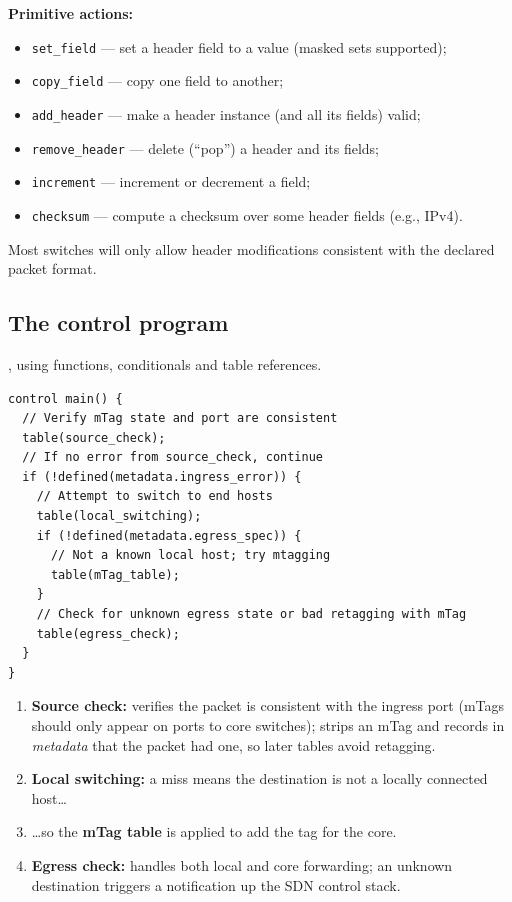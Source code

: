 \textbf{Primitive actions:}
\begin{itemize}
\item \texttt{set\_field} --- set a header field to a value (masked sets supported);
\item \texttt{copy\_field} --- copy one field to another;
\item \texttt{add\_header} --- make a header instance (and all its fields) valid;
\item \texttt{remove\_header} --- delete (``pop'') a header and its fields;
\item \texttt{increment} --- increment or decrement a field;
\item \texttt{checksum} --- compute a checksum over some header fields (e.g., IPv4).
\end{itemize}
Most switches will only allow header modifications consistent with the declared packet format.

\subsection{The control program}
, using functions, conditionals and table references.
\begin{lstlisting}
control main() {
  // Verify mTag state and port are consistent
  table(source_check);
  // If no error from source_check, continue
  if (!defined(metadata.ingress_error)) {
    // Attempt to switch to end hosts
    table(local_switching);
    if (!defined(metadata.egress_spec)) {
      // Not a known local host; try mtagging
      table(mTag_table);
    }
    // Check for unknown egress state or bad retagging with mTag
    table(egress_check);
  }
}
\end{lstlisting}
\begin{enumerate}
\item \textbf{Source check:} verifies the packet is consistent with the ingress port (mTags should only appear on ports to core switches); strips an mTag and records in \emph{metadata} that the packet had one, so later tables avoid retagging.
\item \textbf{Local switching:} a miss means the destination is not a locally connected host\ldots
\item \ldots so the \textbf{mTag table} is applied to add the tag for the core.
\item \textbf{Egress check:} handles both local and core forwarding; an unknown destination triggers a notification up the SDN control stack.
\end{enumerate}

